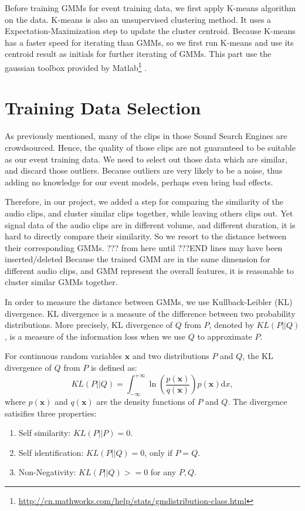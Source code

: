 Before training GMMs for event training data, we first apply K-means algorithm on the data. 
K-means is also an unsupervised clustering method. 
It uses a Expectation-Maximization step to update the cluster centroid. 
Because K-means has a faster speed for iterating than GMMs, so we first run K-means and use its centroid result as initials for further iterating of GMMs. 
This part use the gaussian toolbox provided by Matlab\footnote{\url{http://cn.mathworks.com/help/stats/gmdistribution-class.html}} . 


\section{Training Data Selection}
As previously mentioned, many of the clips in those Sound Search Engines are crowdsourced. 
Hence, the quality of those clips are not guaranteed to be suitable as our event training data.    
We need to select out those data which are similar, and discard those outliers. 
Because outliers are very likely to be a noise, thus adding no knowledge for our event models, perhaps even bring bad effects. 

Therefore, in our project, we added a step for comparing the similarity of the audio clips, and cluster similar clips together, while leaving others clips out. 
Yet signal data of the audio clips are in different volume, and different duration, it is hard to directly compare their similarity. 
So we resort to the distance between their corresponding GMMs. 
??? from here until ???END lines may have been inserted/deleted
Because the trained GMM are in the same dimension for different audio clips, and GMM represent the overall features, it is reasonable to cluster similar GMMs together. 

In order to measure the distance between GMMs, we use Kullback-Leibler (KL) divergence. 
KL divergence is a measure of the difference between two probability distributions. 
More precisely, KL divergence of $Q$ from $P$, denoted by $KL(P||Q)$, is a measure of the information loss when we use $Q$ to approximate $P$.

For continuous random variables $\mathbf{x}$ and two distributions $P$ and $Q$, the KL divergence of $Q$ from $P$ is defined as:
\begin{equation}
KL(P||Q) = \int_{-\infty}^{+\infty}\ln(\frac{p(\mathbf{x})}{q(\mathbf{x})})p(\mathbf{x})\mathrm{d}x,
\label{eq:kl}
\end{equation}
where $p(\mathbf{x})$ and $q(\mathbf{x})$ are the density functions of $P$ and $Q$.
The divergence satisifies three properties: 
\begin{enumerate}
\item{Self similarity: $KL(P||P) = 0$}. 
\item{Self identification: $KL(P||Q) = 0$, only if $P = Q$}. 
\item{Non-Negativity: $KL(P||Q) >= 0$ for any $P, Q$}. 
\end{enumerate}

